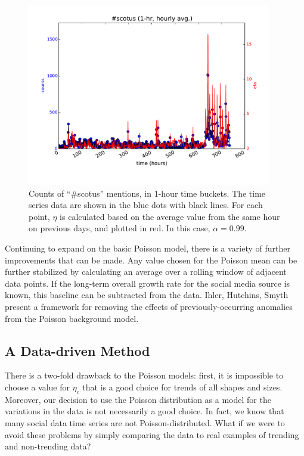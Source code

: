 \documentclass{article}
\begin{document}
\begin{figure}
\begin{center}
\includegraphics[width=0.95\textwidth]{fig/scotus_1month_ccpm.pdf}
\caption{Counts of ``\#scotus'' mentions, in 1-hour time buckets. The time series
data are shown in the blue dots with black lines. For each point, $\eta$ is
calculated based on the average value from the same hour on previous days, and
plotted in red. In this case, $\alpha=0.99$. }
\label{fig:scotus4}
\end{center}
\end{figure}

Continuing to expand on the basic Poisson model, there is a variety of
further improvements that can be made. Any value chosen for the Poisson
mean can be further stabilized by calculating an average over a rolling
window of adjacent data points. If the long-term overall growth rate for
the social media source is known, this baseline can be subtracted from the
data. Ihler, Hutchins, Smyth \cite{Ihler:2006} present a
framework for removing the effects of previously-occurring anomalies from
the Poisson background model. 



\subsection{A Data-driven Method} 
\label{nikolov}

There is a two-fold drawback to the Poisson models: first, it is impossible to
choose a value for $\eta_c$ that is a good choice for trends of all shapes
and sizes. Moreover, our decision to use the Poisson distribution as a model
for the variations in the data is not necessarily a good choice. In fact, we
know that many social data time series are not Poisson-distributed. What if we
were to avoid these problems by simply comparing the data to real examples of
trending and non-trending data?
\end{document}
